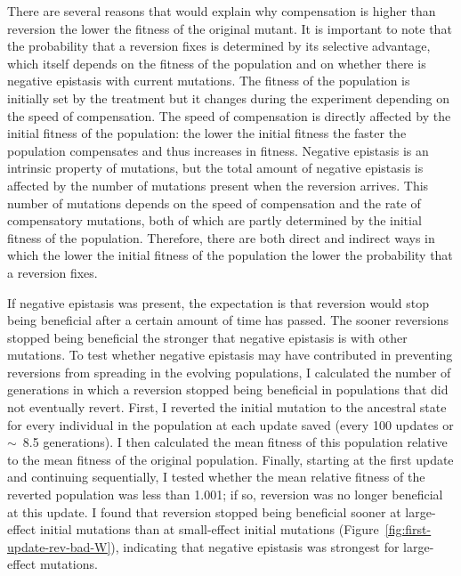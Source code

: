 \begin{doublespace}
There are several reasons that would explain why compensation
is higher than reversion the lower the fitness of the original mutant.
%
It is important to note that the probability
that a reversion fixes is determined by its selective advantage,
which itself depends on the fitness of the population
and on whether there is negative epistasis with current mutations.
%
The fitness of the population is initially set by the treatment
but it changes during the experiment depending on the speed of compensation.
%
The speed of compensation is directly affected by
the initial fitness of the population: the lower the initial fitness
the faster the population compensates and thus increases in fitness.
%
Negative epistasis is an intrinsic property of mutations,
but the total amount of negative epistasis is affected
by the number of mutations present when the reversion arrives.
%
This number of mutations depends on the speed of compensation
and the rate of compensatory mutations,
both of which are partly determined by the initial fitness of the population.
%
Therefore, there are both direct and indirect ways
in which the lower the initial fitness of the population
the lower the probability that a reversion fixes.



If negative epistasis was present,
the expectation is that reversion would stop being beneficial
after a certain amount of time has passed.
%
The sooner reversions stopped being beneficial
the stronger that negative epistasis is with other mutations.
%
To test whether negative epistasis may have contributed in
preventing reversions from spreading in the evolving populations,
I calculated the number of generations in which a reversion
stopped being beneficial in populations that did not eventually revert.
%
First, I reverted the initial mutation to the ancestral state
for every individual in the population at each update saved
(every 100 updates or $\sim$~8.5 generations).
%
I then calculated the mean fitness of this population
relative to the mean fitness of the original population.
%
Finally, starting at the first update and continuing sequentially,
I tested whether the mean relative fitness of the reverted population
was less than 1.001; if so, reversion was no longer beneficial at this update.
%
I found that reversion stopped being beneficial sooner
at large-effect initial mutations than at small-effect initial mutations
(Figure~\ref{fig:first-update-rev-bad-W}),
indicating that negative epistasis was strongest for large-effect mutations.




\end{doublespace}
